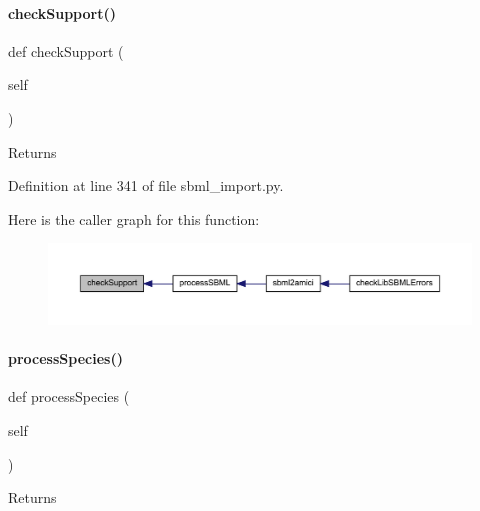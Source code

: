 \paragraph{\texorpdfstring{check\+Support()}{checkSupport()}}
{\footnotesize\ttfamily def check\+Support (\begin{DoxyParamCaption}\item[{}]{self }\end{DoxyParamCaption})}

\begin{DoxyReturn}{Returns}

\end{DoxyReturn}


Definition at line 341 of file sbml\+\_\+import.\+py.

Here is the caller graph for this function\+:
\nopagebreak
\begin{figure}[H]
\begin{center}
\leavevmode
\includegraphics[width=350pt]{classamici_1_1sbml__import_1_1_sbml_importer_ae9585f937c02f0618abeb06dd48bcd54_icgraph}
\end{center}
\end{figure}
\mbox{\label{classamici_1_1sbml__import_1_1_sbml_importer_a4912a89bf86ec8e0c1d9758b8090e327}} 
\paragraph{\texorpdfstring{process\+Species()}{processSpecies()}}
{\footnotesize\ttfamily def process\+Species (\begin{DoxyParamCaption}\item[{}]{self }\end{DoxyParamCaption})}

\begin{DoxyReturn}{Returns}

\end{DoxyReturn}


